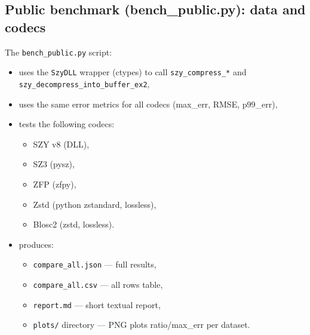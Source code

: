 \documentclass[11pt,a4paper]{article}
\begin{document}
\subsection{Public benchmark (bench\_public.py): data and codecs}
The \texttt{bench\_public.py} script:
\begin{itemize}
  \item uses the \texttt{SzyDLL} wrapper (ctypes) to call \texttt{szy\_compress\_*} and \texttt{szy\_decompress\_into\_buffer\_ex2},
  \item uses the same error metrics for all codecs (max\_err, RMSE, p99\_err),
  \item tests the following codecs:
        \begin{itemize}
          \item SZY v8 (DLL),
          \item SZ3 (pysz),
          \item ZFP (zfpy),
          \item Zstd (python zstandard, lossless),
          \item Blosc2 (zstd, lossless).
        \end{itemize}
  \item produces:
        \begin{itemize}
          \item \texttt{compare\_all.json} --- full results,
          \item \texttt{compare\_all.csv} --- all rows table,
          \item \texttt{report.md} --- short textual report,
          \item \texttt{plots/} directory --- PNG plots ratio/max\_err per dataset.
        \end{itemize}
\end{itemize}
\end{document}

